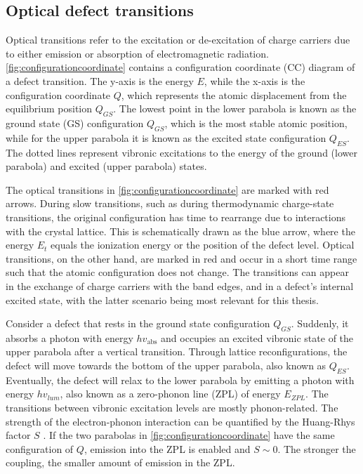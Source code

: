 

\subsection{Optical defect transitions}

Optical transitions refer to the excitation or de-excitation of charge carriers due to either emission or absorption of electromagnetic radiation. %
\autoref{fig:configurationcoordinate} contains a configuration coordinate (CC) diagram of a defect transition. The y-axis is the energy $E$, while the x-axis is the configuration coordinate $Q$, which represents the atomic displacement from the equilibrium position $Q_{GS}$. The lowest point in the lower parabola is known as the ground state (GS) configuration $Q_{GS}$, which is the most stable atomic position, while for the upper parabola it is known as the excited state configuration $Q_{ES}$. The dotted lines represent vibronic excitations to the energy of the ground (lower parabola) and excited (upper parabola) states.

The optical transitions in \autoref{fig:configurationcoordinate} are marked with red arrows. During slow transitions, such as during thermodynamic charge-state transitions, the original configuration has time to rearrange due to interactions with the crystal lattice. This is schematically drawn as the blue arrow, where the energy $E_t$ equals the ionization energy or the position of the defect level. Optical transitions, on the other hand, are marked in red and occur in a short time range such that the atomic configuration does not change. The transitions can appear in the exchange of charge carriers with the band edges, and in a defect's internal excited state, with the latter scenario being most relevant for this thesis.

Consider a defect that rests in the ground state configuration $Q_{GS}$. Suddenly, it absorbs a photon with energy $h v_{\text{abs}}$ and occupies an excited vibronic state of the upper parabola after a vertical transition. Through lattice reconfigurations, the defect will move towards the bottom of the upper parabola, also known as $Q_{ES}$. Eventually, the defect will relax to the lower parabola by emitting a photon with energy $h v_{lum}$, also known as a zero-phonon line (ZPL) of energy $E_{ZPL}$. The transitions between vibronic excitation levels are mostly phonon-related.
The strength of the electron-phonon interaction can be quantified by the Huang-Rhys factor $S$ \cite{Huang1950}. If the two parabolas in \autoref{fig:configurationcoordinate} have the same configuration of $Q$, emission into the ZPL is enabled and $S\sim 0$. The stronger the coupling, the smaller amount of emission in the ZPL.

